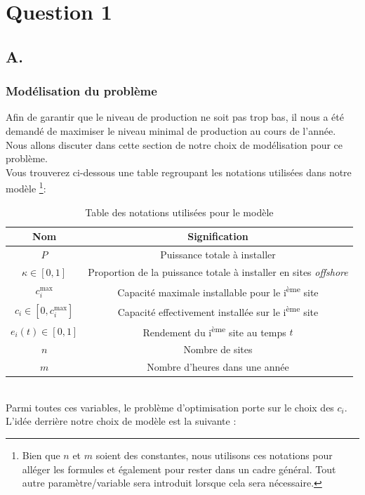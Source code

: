 \documentclass{article}
\newlength{\temp}
\begin{document}


\section*{Question 1}

\subsection*{A.}
\subsubsection*{Modélisation du problème}
Afin de garantir que le niveau de production ne soit pas trop bas, il nous a été demandé de maximiser le niveau minimal de production au cours de l'année. Nous allons discuter dans cette section de notre choix de modélisation pour ce problème.\\
Vous trouverez ci-dessous une table regroupant les notations utilisées dans notre modèle \footnote{Bien que $n$ et $m$ soient des constantes, nous utilisons ces notations pour alléger les formules et également pour rester dans un cadre général. Tout autre paramètre/variable sera introduit lorsque cela sera nécessaire.}:
\begin{table}[h!]
\centering
\renewcommand{\arraystretch}{1.5}%
\begin{tabular}{|c || c |} 
 \hline
Nom & Signification\\
 \hline\hline
 $P$  & Puissance totale à installer\\
 $\kappa \in [0, 1]$ & Proportion de la puissance totale à installer en sites \textit{offshore}\\
 $c^\text{max}_i$ & Capacité maximale installable pour le i\textsuperscript{ème} site\\
 $c_i \in [0, c_i^{\max}]$ & Capacité effectivement installée sur le i\textsuperscript{ème} site\\
 $e_i(t) \in [0,1]$ & Rendement du i\textsuperscript{ème} site au temps $t$\\
 $n$ & Nombre de sites\\
 $m$ & Nombre d'heures dans une année\\
 \hline
\end{tabular}
\caption{Table des notations utilisées pour le modèle}
\label{table:noms_des_variables}
\end{table}
\noindent \\
Parmi toutes ces variables, le problème d'optimisation porte sur le choix des $c_i$. L'idée derrière notre choix de modèle est la suivante : \\
\end{document}
